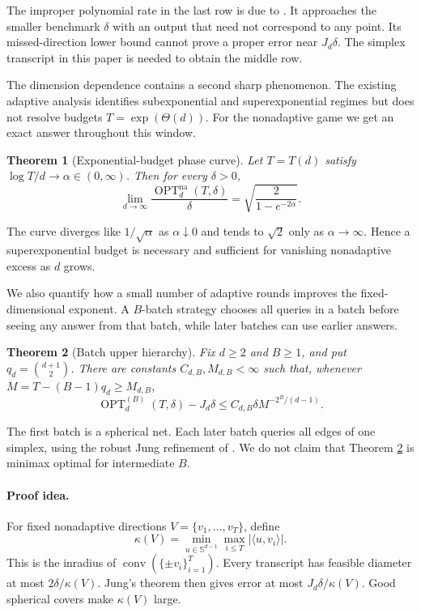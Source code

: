 \documentclass{article}
\newcommand{\Sph}{\mathbb{S}}
\newcommand{\ip}[2]{\langle #1,#2\rangle}
\newcommand{\OPT}{\operatorname{OPT}}
\newcommand{\conv}{\operatorname{conv}}
\newcommand{\na}{\mathrm{na}}
\newtheorem{theorem}{Theorem}
\theoremstyle{definition}
\begin{document}
The improper polynomial rate in the last row is due to \citet{filmus2026optimal}.  It approaches the smaller benchmark $\delta$ with an output that need not correspond to any point.  Its missed-direction lower bound cannot prove a proper error near $J_d\delta$.  The simplex transcript in this paper is needed to obtain the middle row.

The dimension dependence contains a second sharp phenomenon.  The existing adaptive analysis identifies subexponential and superexponential regimes but does not resolve budgets $T=\exp(\Theta(d))$.  For the nonadaptive game we get an exact answer throughout this window.

\begin{theorem}[Exponential-budget phase curve]                     \label{thm:phase}
Let $T=T(d)$ satisfy $\log T/d\to\alpha\in(0,\infty)$.  Then for every $\delta>0$, \[ \lim_{d\to\infty}\frac{\OPT^{\na}_d(T,\delta)}{\delta} = \sqrt{\frac{2}{1-e^{-2\alpha}}}. \]
\end{theorem}

The curve diverges like $1/\sqrt{\alpha}$ as $\alpha\downarrow0$ and tends to $\sqrt2$ only as $\alpha\to\infty$.  Hence a superexponential budget is necessary and sufficient for vanishing nonadaptive excess as $d$ grows.

We also quantify how a small number of adaptive rounds improves the fixed- dimensional exponent.  A $B$-batch strategy chooses all queries in a batch before seeing any answer from that batch, while later batches can use earlier answers.

\begin{theorem}[Batch upper hierarchy]                              \label{thm:batch}
Fix $d\geq2$ and $B\geq1$, and put $q_d=\binom{d+1}{2}$.  There are constants $C_{d,B},M_{d,B}<\infty$ such that, whenever $M=T-(B-1)q_d\geq M_{d,B}$, \[ \OPT^{(B)}_d(T,\delta)-J_d\delta \leq C_{d,B}\delta M^{-2^B/(d-1)}. \]
\end{theorem}

The first batch is a spherical net.  Each later batch queries all edges of one simplex, using the robust Jung refinement of \citet{filmus2026optimal}.  We do not claim that Theorem \ref{thm:batch} is minimax optimal for intermediate $B$.

\paragraph{Proof idea.}
For fixed nonadaptive directions $V=\{v_1,\ldots,v_T\}$, define \[ \kappa(V)=\min_{u\in\Sph^{d-1}}\max_{i\leq T}|\ip{u}{v_i}|. \] This is the inradius of $\conv(\{\pm v_i\}_{i=1}^T)$.  Every transcript has feasible diameter at most $2\delta/\kappa(V)$.  Jung's theorem then gives error at most $J_d\delta/\kappa(V)$.  Good spherical covers make $\kappa(V)$ large.
\end{document}
